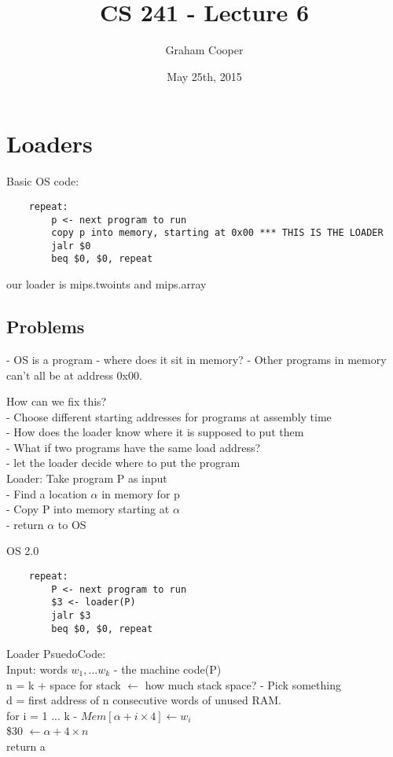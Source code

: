 \documentclass[12pt]{article}
\title{\vspace{-15ex}CS 241 - Lecture 6\vspace{-1ex}}
\date{May 25th, 2015}
\author{Graham Cooper}
\begin{document}
	\maketitle
	\lstset{language=[mips]Assembler}
	
	\section*{Loaders}
	
	Basic OS code:\\
	\begin{verbatim}
	repeat:
		p <- next program to run
		copy p into memory, starting at 0x00 *** THIS IS THE LOADER
		jalr $0
		beq $0, $0, repeat	
	\end{verbatim}
	
	our loader is mips.twoints and mips.array\\
	
	\subsection*{Problems}
	- OS is a program - where does it sit in memory?
	- Other programs in memory can't all be at address 0x00.
	
	How can we fix this?\\
	- Choose different starting addresses for programs at assembly time\\
	- How does the loader know where it is supposed to put them\\
	- What if two programs have the same load address?\\
	- let the loader decide where to put the program\\
	
	Loader: Take program P as input\\
	- Find a location $\alpha$ in memory for p\\
	- Copy P into memory starting at $\alpha$\\
	- return $\alpha$ to OS
	
	OS 2.0\\
	\begin{verbatim}
	repeat: 
		P <- next program to run
		$3 <- loader(P)
		jalr $3
		beq $0, $0, repeat
	\end{verbatim}
	
	Loader PsuedoCode:\\
	Input: words $w_1, ... w_k$ - the machine code(P)\\
	n = k + space for stack $\leftarrow$ how much stack space? - Pick something\\
	d = first address of n consecutive words of unused RAM.\\
	for i = 1 ... k
	- $Mem[\alpha+ i \times 4] \leftarrow w_i$\\
	\$30 $\leftarrow \alpha + 4 \times n$\\
	return a\\
	
\end{document}
